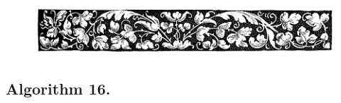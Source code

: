 \documentclass[preview]{standalone}
\begin{document}
\begin{figure}[!h]
    \centering
    \includegraphics[width=14cm]{../resources/jpg/3.1.algorithms/border2.jpg}
\end{figure}
\subsection[Partial sort.]{
    \color{section} Algorithm 16.
}

\vspace{1\baselineskip}
\begin{center}
    
\end{center}
\vspace{1\baselineskip}
\begin{center}
    
\end{center}
\end{document}

